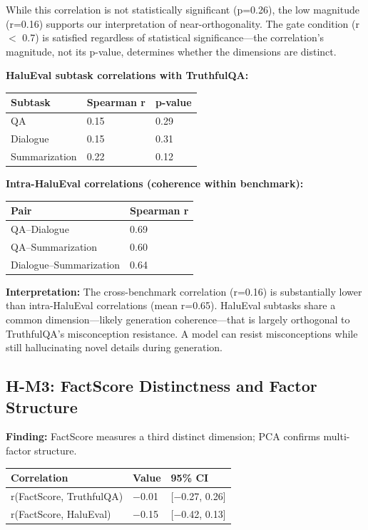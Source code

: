 While this correlation is not statistically significant (p=0.26), the low magnitude (r=0.16) supports our interpretation of near-orthogonality. The gate condition (r $<$ 0.7) is satisfied regardless of statistical significance---the correlation's magnitude, not its p-value, determines whether the dimensions are distinct.

\textbf{HaluEval subtask correlations with TruthfulQA:}

\begin{table}[h]
\centering
\begin{tabular}{@{}lll@{}}
\toprule
\textbf{Subtask} & \textbf{Spearman r} & \textbf{p-value} \\
\midrule
QA & 0.15 & 0.29 \\
Dialogue & 0.15 & 0.31 \\
Summarization & 0.22 & 0.12 \\
\bottomrule
\end{tabular}
\end{table}

\textbf{Intra-HaluEval correlations (coherence within benchmark):}

\begin{table}[h]
\centering
\begin{tabular}{@{}ll@{}}
\toprule
\textbf{Pair} & \textbf{Spearman r} \\
\midrule
QA--Dialogue & 0.69 \\
QA--Summarization & 0.60 \\
Dialogue--Summarization & 0.64 \\
\bottomrule
\end{tabular}
\end{table}

\textbf{Interpretation:} The cross-benchmark correlation (r=0.16) is substantially lower than intra-HaluEval correlations (mean r=0.65). HaluEval subtasks share a common dimension---likely generation coherence---that is largely orthogonal to TruthfulQA's misconception resistance. A model can resist misconceptions while still hallucinating novel details during generation.

\subsection{H-M3: FactScore Distinctness and Factor Structure}

\textbf{Finding:} FactScore measures a third distinct dimension; PCA confirms multi-factor structure.

\begin{table}[h]
\centering
\begin{tabular}{@{}lll@{}}
\toprule
\textbf{Correlation} & \textbf{Value} & \textbf{95\% CI} \\
\midrule
r(FactScore, TruthfulQA) & $-$0.01 & [$-$0.27, 0.26] \\
r(FactScore, HaluEval) & $-$0.15 & [$-$0.42, 0.13] \\
\bottomrule
\end{tabular}
\end{table}


